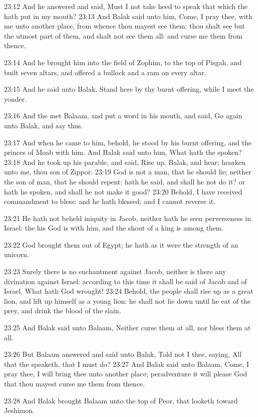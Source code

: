 23:12 And he answered and said, Must I not take heed to speak that which the \LORD hath put in my mouth?  23:13 And Balak said unto him, Come, I pray thee, with me unto another place, from whence thou mayest see them: thou shalt see but the utmost part of them, and shalt not see them all: and curse me them from thence.

23:14 And he brought him into the field of Zophim, to the top of Pisgah, and built seven altars, and offered a bullock and a ram on every altar.

23:15 And he said unto Balak, Stand here by thy burnt offering, while I meet the \LORD yonder.

23:16 And the \LORD met Balaam, and put a word in his mouth, and said, Go again unto Balak, and say thus.

23:17 And when he came to him, behold, he stood by his burnt offering, and the princes of Moab with him. And Balak said unto him, What hath the \LORD spoken?  23:18 And he took up his parable, and said, Rise up, Balak, and hear; hearken unto me, thou son of Zippor: 23:19 God is not a man, that he should lie; neither the son of man, that he should repent: hath he said, and shall he not do it? or hath he spoken, and shall he not make it good?  23:20 Behold, I have received commandment to bless: and he hath blessed; and I cannot reverse it.

23:21 He hath not beheld iniquity in Jacob, neither hath he seen perverseness in Israel: the \LORD his God is with him, and the shout of a king is among them.

23:22 God brought them out of Egypt; he hath as it were the strength of an unicorn.

23:23 Surely there is no enchantment against Jacob, neither is there any divination against Israel: according to this time it shall be said of Jacob and of Israel, What hath God wrought!  23:24 Behold, the people shall rise up as a great lion, and lift up himself as a young lion: he shall not lie down until he eat of the prey, and drink the blood of the slain.

23:25 And Balak said unto Balaam, Neither curse them at all, nor bless them at all.

23:26 But Balaam answered and said unto Balak, Told not I thee, saying, All that the \LORD speaketh, that I must do?  23:27 And Balak said unto Balaam, Come, I pray thee, I will bring thee unto another place; peradventure it will please God that thou mayest curse me them from thence.

23:28 And Balak brought Balaam unto the top of Peor, that looketh toward Jeshimon.

